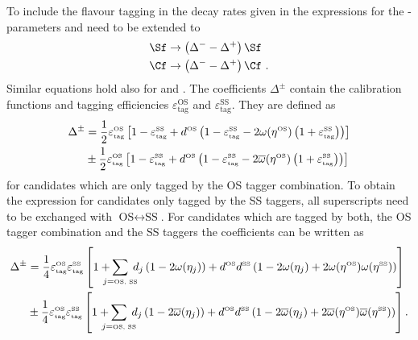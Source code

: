 To include the flavour tagging in the decay rates given in  the expressions for the \CP-parameters \Sf and \Cf need to be extended to
\begin{equation}
\begin{aligned}
\Sf&\to\left(\Delta^--\Delta^+\right)\Sf\\
\Cf&\to\left(\Delta^--\Delta^+\right)\Cf\,\,.\label{eq:decRateCorrectFT}
\end{aligned}
\end{equation}
Similar equations hold also for \Sfbar and \Cfbar.
The coefficients $\Delta^\pm$ contain the calibration functions and tagging efficiencies $\varepsilon_{\text{tag}}^{\text{OS}}$ and $\varepsilon_{\text{tag}}^{\text{SS}}$.
They are defined as
\begin{align}
\Delta^\pm&=\frac{1}{2}\varepsilon_{\text{\tiny tag}}^{\text{\tiny OS}}\left[1-\varepsilon_{\text{\tiny tag}}^{\text{\tiny SS}}+d^{\text{\tiny OS}}\left(1-\varepsilon_{\text{\tiny tag}}^{\text{\tiny SS}}-2\omega(\eta^{\text{\tiny OS}})\left(1+\varepsilon_{\text{\tiny tag}}^{\text{\tiny SS}}\right)\right)\right]\nonumber\\
&\pm\frac{1}{2}\varepsilon_{\text{\tiny tag}}^{\text{\tiny OS}}\left[1-\varepsilon_{\text{\tiny tag}}^{\text{\tiny SS}}+d^{\text{\tiny OS}}\left(1-\varepsilon_{\text{\tiny tag}}^{\text{\tiny SS}}-2\overline{\omega}(\eta^{\text{\tiny OS}})\left(1+\varepsilon_{\text{\tiny tag}}^{\text{\tiny SS}}\right)\right)\right]
\end{align}
for candidates which are only tagged by the OS tagger combination.
To obtain the expression for candidates only tagged by the SS taggers, all superscripts need to be exchanged with $\text{OS}\leftrightarrow\text{SS}$.
For candidates which are tagged by both, the OS tagger combination and the SS taggers the coefficients can be written as
\begin{align}
\Delta^\pm&=\frac{1}{4}\varepsilon_{\text{\tiny tag}}^{\text{\tiny OS}}\varepsilon_{\text{\tiny tag}}^{\text{\tiny SS}}\left[1+\hspace{-3mm}\sum_{j=\text{\tiny OS, SS}}\hspace{-2mm}d_j\left(1-2\omega(\eta_j)\right)+d^{\text{\tiny OS}}d^{\text{\tiny SS}}\left(1-2\omega(\eta_j)+2\omega(\eta^{\text{\tiny OS}})\omega(\eta^{\text{\tiny SS}})\right)\right]\nonumber\\
&\pm\frac{1}{4}\varepsilon_{\text{\tiny tag}}^{\text{\tiny OS}}\varepsilon_{\text{\tiny tag}}^{\text{\tiny SS}}\left[1+\hspace{-3mm}\sum_{j=\text{\tiny OS, SS}}\hspace{-2mm}d_j\left(1-2\overline{\omega}(\eta_j)\right)+d^{\text{\tiny OS}}d^{\text{\tiny SS}}\left(1-2\overline{\omega}(\eta_j)+2\overline{\omega}(\eta^{\text{\tiny OS}})\overline{\omega}(\eta^{\text{\tiny SS}})\right)\right].
\end{align}

